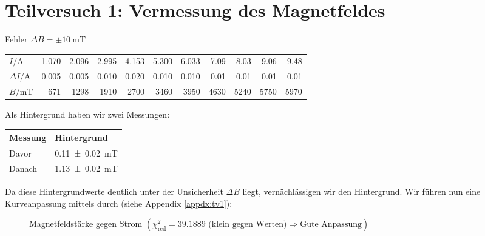 \section{Teilversuch 1: Vermessung des Magnetfeldes}
	Fehler $\Delta B = \pm \SI{10}{\milli\tesla}$
	\begin{center}
		\begin{tabular}{l | *{10}{r}}
			\toprule
			$I/\si{\ampere}$ & \num{1.070} & \num{2.096} & \num{2.995} & \num{4.153} & \num{5.300} & \num{6.033} & \num{7.09} & \num{8.03} & \num{9.06} & \num{9.48} \\
			$\Delta I/\si{\ampere}$ & \num{0.005} & \num{0.005} & \num{0.010} & \num{0.020} & \num{0.010} & \num{0.010} & \num{0.01} & \num{0.01} & \num{0.01} & \num{0.01} \\
			\midrule
			$B/\si{\milli\tesla}$ & \num{671} & \num{1298} & \num{1910} & \num{2700} & \num{3460} & \num{3950} & \num{4630} & \num{5240} & \num{5750} & \num{5970} \\
			\bottomrule
		\end{tabular}
	\end{center}
	Als Hintergrund haben wir zwei Messungen:
	\begin{center}
		\begin{tabular}{ll}
			\toprule
			Messung & Hintergrund \\
			\midrule
			Davor  & \SI{0.11(2)}{\milli\tesla} \\
			Danach & \SI{1.13(2)}{\milli\tesla} \\
			\bottomrule
		\end{tabular}
	\end{center}
	Da diese Hintergrundwerte deutlich unter der Unsicherheit $\Delta B$ liegt, vernächlässigen wir den Hintergrund. 
	\newpage
	Wir führen nun eine Kurveanpassung mittels \gnuplot{} durch (siehe Appendix \ref{appdx:tv1}):
	\begin{figure}[!ht]
		\vspace{-1em}
	    \centering
	    
	    \caption{\centering Magnetfeldstärke gegen Strom $\left(\chi^2_{\text{red}} = \num{39.1889} \text{ (klein gegen Werten)} \Rightarrow \text{Gute Anpassung}\right)$}
	    \label{fig:tv1}
	    \vspace{-1em}
	\end{figure}

